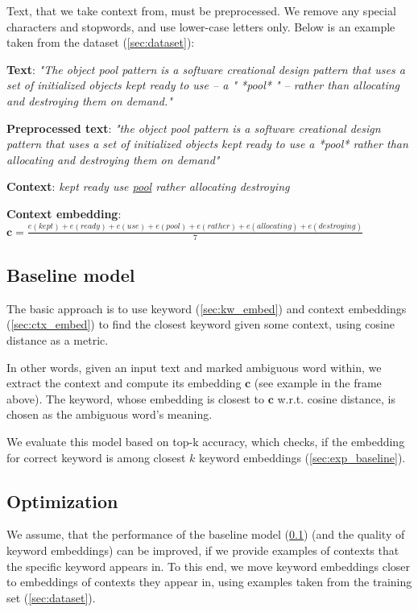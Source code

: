 \documentclass{llncs}
\begin{document}
Text, that we take context from, must be preprocessed.
We remove any special characters and stopwords, and use lower-case letters only. Below is an example taken from the dataset (\ref{sec:dataset}):

\begin{tcolorbox}[
    colframe=blue!25,
    colback=white!10,
    coltitle=white!20!black,
    title={Example for keyword \textit{pool (computer science)} with context length \(l=3\)}]

\textbf{Text}:
\textit{"The object pool pattern is a software creational design pattern that uses a set of initialized objects kept ready to use – a " *pool* " – rather than allocating and destroying them on demand."}

\textbf{Preprocessed text}:
\textit{"the object pool pattern is a software creational design pattern that uses a set of initialized objects kept ready to use a *pool* rather than allocating and destroying them on demand"}

\textbf{Context}:
\textit{kept ready use \underline{pool} rather allocating destroying}

\textbf{Context embedding}:
\(\bm{c} = \frac{e(kept) + e(ready) + e(use) + e(pool) + e(rather) + e(allocating) + e(destroying)}{7}\)

\end{tcolorbox}

\subsection{Baseline model}
\label{sec:baseline_model}
The basic approach is to use keyword (\ref{sec:kw_embed}) and context embeddings (\ref{sec:ctx_embed}) to find the closest keyword given some context, using cosine distance as a metric.

In other words, given an input text and marked ambiguous word within, we extract the context and compute its embedding \(\bm{c}\) (see example in the frame above). The keyword, whose embedding is closest to \(\bm{c}\) w.r.t. cosine distance, is chosen as the ambiguous word's meaning.

We evaluate this model based on top-k accuracy, which checks, if the embedding for correct keyword is among closest \(k\) keyword embeddings (\ref{sec:exp_baseline}).


\subsection{Optimization}
\label{sec:optimization}
We assume, that the performance of the baseline model (\ref{sec:baseline_model}) (and the quality of keyword embeddings) can be improved, if we provide examples of contexts that the specific keyword appears in. To this end, we move keyword embeddings closer to embeddings of contexts they appear in, using examples taken from the training set (\ref{sec:dataset}).
\end{document}
